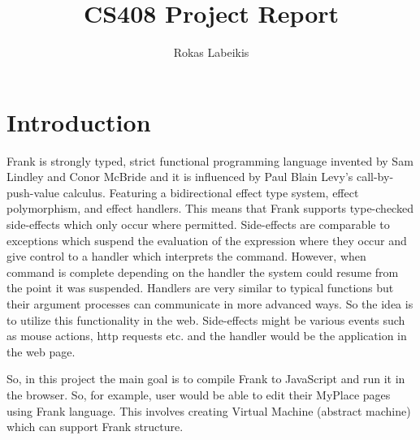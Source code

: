 \documentclass[12pt]{report}
\begin{document}
\title{CS408 Project Report}
\author{Rokas Labeikis}
\maketitle


\section{Introduction}

Frank is strongly typed, strict functional programming language invented by
Sam Lindley and Conor McBride and it is influenced by Paul Blain Levy’s
call-by-push-value calculus. Featuring  a bidirectional effect type system,
effect polymorphism, and effect handlers. This means that Frank supports
type-checked side-effects which only occur where permitted.
Side-effects are comparable to exceptions which suspend the evaluation of the
expression where they occur and give control to a handler which interprets
the command. However, when command is complete depending on the handler the
system could resume from the point it was suspended. Handlers are very similar
to typical functions but their argument processes can communicate in more
advanced ways. So the idea is to utilize this functionality in the web.
Side-effects might be various events such as mouse actions, http requests etc.
and the handler would be the application in the web page.

So, in this project the main goal is to compile Frank to JavaScript and run it
in the browser. So, for example, user would be able to edit their MyPlace pages
using Frank language. This involves creating Virtual Machine (abstract machine)
which can support Frank structure.
\end{document}
